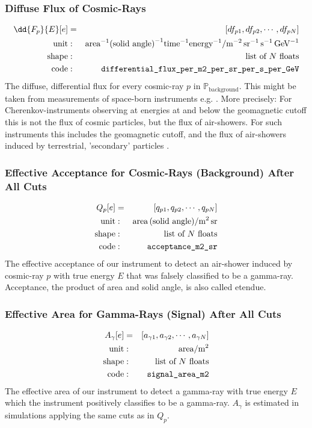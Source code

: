 \documentclass{article}%
\begin{document}
\subsubsection*{Diffuse Flux of Cosmic-Rays}
%
\begin{eqnarray*}
\dd{F_p}{E}[e] &=& [df_{p1}, df_{p2}, \cdots, df_{pN}]\\
\text{unit} &:& \text{area}^{-1} \text{(solid angle)}^{-1} \text{time}^{-1} \text{energy}^{-1} / \text{m}^{-2}\, \text{sr}^{-1}\,\text{s}^{-1}\,\text{GeV}^{-1}\\
\text{shape} &:& \text{list of}\,\,N\,\,\text{floats}\\
\text{code} &:& \verb|differential_flux_per_m2_per_sr_per_s_per_GeV|
\end{eqnarray*}
%
The diffuse, differential flux for every cosmic-ray $p$ in $\mathbb{P}_\text{background}$. This might be taken from measurements of space-born instruments e.g. \cite{aguilar2014precision,aguilar2015precision}.
%
More precisely: For Cherenkov-instruments observing at energies at and below the geomagnetic cutoff this is not the flux of cosmic particles, but the flux of air-showers.
%
For such instruments this includes the geomagnetic cutoff, and the flux of air-showers induced by terrestrial, 'secondary' particles \cite{lipari2002fluxes}.
%
\subsubsection*{Effective Acceptance for Cosmic-Rays (Background) After All Cuts}
\begin{eqnarray*}
Q_p[e] &=& [q_{p1}, q_{p2}, \cdots, q_{pN}]\\
\text{unit} &:& \text{area} \, \text{(solid angle)} / \text{m}^{2}\,\text{sr}\\
\text{shape} &:& \text{list of}\,\,N\,\,\text{floats}\\
\text{code} &:& \verb|acceptance_m2_sr|
\end{eqnarray*}
%
The effective acceptance of our instrument to detect an air-shower induced by cosmic-ray $p$ with true energy $E$ that was falsely classified to be a gamma-ray.
%
Acceptance, the product of area and solid angle, is also called etendue.
%
\subsubsection*{Effective Area for Gamma-Rays (Signal) After All Cuts}
\begin{eqnarray*}
A_\gamma[e] &=& [a_{\gamma 1}, a_{\gamma 2}, \cdots, a_{\gamma N}]\\
\text{unit} &:& \text{area} / \text{m}^{2}\\
\text{shape} &:& \text{list of}\,\,N\,\,\text{floats}\\
\text{code} &:& \verb|signal_area_m2|
\end{eqnarray*}
%
The effective area of our instrument to detect a gamma-ray with true energy $E$ which the instrument positively classifies to be a gamma-ray.
%
$A_\gamma$ is estimated in simulations applying the same cuts as in $Q_p$.
%
\end{document}
